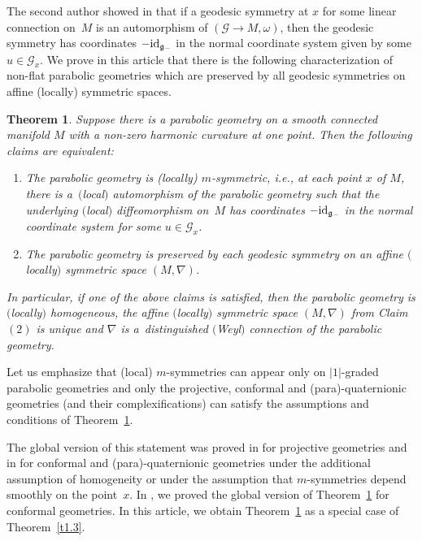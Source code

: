 \documentclass[pdftex]{sigma}
\newcommand{\om}{\omega}
\newcommand{\ba}{\mathcal{G}}
\newcommand{\fg}{\mathfrak g}
\newcommand{\id}{{\rm id}}
\numberwithin{equation}{section}
\newtheorem{Theorem}{Theorem}[section]
\begin{document}
The second author showed in \cite[Theorem~3.2]{LZ1} that if a geodesic symmetry at $x$ for some linear connection on~$M$ is an automorphism of $(\ba\to M,\om)$, then the geodesic symmetry has coordinates $-\id_{\fg_-}$ in the normal coordinate system given by some $u\in \ba_x$. We prove in this article that there is the following characterization of non-f\/lat parabolic geometries which are preserved by all geodesic symmetries on af\/f\/ine (locally) symmetric spaces.

\begin{Theorem}\label{t1.1}
Suppose there is a parabolic geometry on a smooth connected manifold $M$ with a non-zero harmonic curvature at one point. Then the following claims are equivalent:
\begin{enumerate}\itemsep=0pt
\item[$1.$] The parabolic geometry is (locally) $m$-symmetric, i.e., at each point $x$ of $M$, there is a~$($local$)$ automorphism of the parabolic geometry such that the underlying $($local$)$ diffeomorphism on~$M$ has coordinates $-\id_{\fg_-}$ in the normal coordinate system for some $u\in \ba_x$.
\item[$2.$] The parabolic geometry is preserved by each geodesic symmetry on an affine $($locally$)$ symmetric space $(M,\nabla)$.
\end{enumerate}

In particular, if one of the above claims is satisfied, then the parabolic geometry is $($locally$)$ homogeneous, the affine $($locally$)$ symmetric space $(M,\nabla)$ from Claim~$(2)$ is unique and $\nabla$ is a~distinguished $($Weyl$)$ connection of the parabolic geometry.
\end{Theorem}
\begin{Remark}
Let us emphasize that (local) $m$-symmetries can appear only on $|1|$-graded parabolic geometries and only the projective, conformal and (para)-quaternionic geometries (and their complexif\/ications) can satisfy the assumptions and conditions of Theorem~\ref{t1.1}.
\end{Remark}

The global version of this statement was proved in \cite{Podesta} for projective geometries and in \cite[Corollary 4.5]{LZ3} for conformal and (para)-quaternionic geometries under the additional assumption of homogeneity or under the assumption that $m$-symmetries depend smoothly on the point~$x$. In \cite[Theorem~1]{GZ4}, we proved the global version of Theorem~\ref{t1.1} for conformal geometries. In this article, we obtain Theorem~\ref{t1.1} as a special case of Theorem~\ref{t1.3}.
\end{document}
